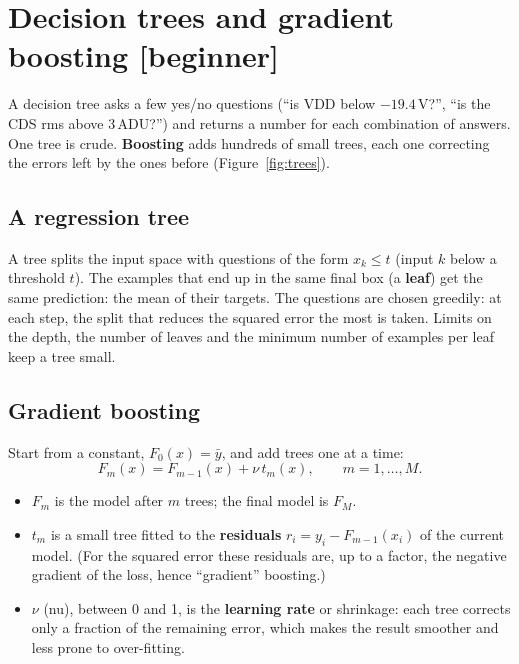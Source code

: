 \documentclass[11pt]{article}
\newcommand{\level}[1]{\hfill{\normalfont\small\color{black!60}[#1]}}
\begin{document}
\section{Decision trees and gradient boosting \level{beginner}}
\label{sec:trees}

\begin{idea}
A decision tree asks a few yes/no questions (``is VDD below $-19.4$\,V?'', ``is the CDS rms above 3\,ADU?'') and returns a number for
each combination of answers. One tree is crude. \textbf{Boosting} adds hundreds of small trees, each one correcting the errors
left by the ones before (Figure~\ref{fig:trees}).
\end{idea}

\subsection{A regression tree}
A tree splits the input space with questions of the form $x_k \leq t$ (input $k$ below a threshold $t$). The examples that end up
in the same final box (a \textbf{leaf}) get the same prediction: the mean of their targets. The questions are chosen greedily: at
each step, the split that reduces the squared error the most is taken. Limits on the depth, the number of leaves and the
minimum number of examples per leaf keep a tree small.

\subsection{Gradient boosting}
Start from a constant, $F_0(x) = \bar y$, and add trees one at a time:
\begin{equation}
F_m(x) = F_{m-1}(x) + \nu\,t_m(x),\qquad m = 1, \dots, M .
\end{equation}
\begin{itemize}
\item $F_m$ is the model after $m$ trees; the final model is $F_M$.
\item $t_m$ is a small tree fitted to the \textbf{residuals} $r_i = y_i - F_{m-1}(x_i)$ of the current model. (For the squared error
  these residuals are, up to a factor, the negative gradient of the loss, hence ``gradient'' boosting.)
\item $\nu$ (nu), between 0 and 1, is the \textbf{learning rate} or shrinkage: each tree corrects only a fraction of the
  remaining error, which makes the result smoother and less prone to over-fitting.
\end{itemize}
\end{document}
